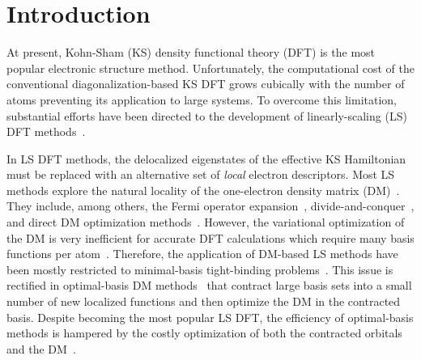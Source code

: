 \documentclass[10pt,amsmath,twocolumn,aps,prl,superscriptaddress,floatfix]{revtex4-1}
\begin{document}
\section{Introduction}

At present, Kohn-Sham (KS) density functional theory (DFT) is the most popular electronic structure method. 
Unfortunately, the computational cost of the conventional diagonalization-based KS DFT grows cubically with the number of atoms preventing its application to large systems. 
To overcome this limitation, substantial efforts have been directed to the development of linearly-scaling (LS) DFT methods~\cite{goedecker1999linear,bowler2012methods,zalesny2011linear}. 

In LS DFT methods, the delocalized eigenstates of the effective KS Hamiltonian must be replaced with an alternative set of \emph{local} electron descriptors. 
Most LS methods explore the natural locality of the one-electron density matrix (DM)~\cite{li1993density, lee1996linear, li2003density, shao2003curvy, vandevondele2012linear, kussmann2013linear, aarons2016perspective}.  
They include, among others, the Fermi operator expansion~\cite{goedecker1994efficient, goedecker1995tight}, divide-and-conquer~\cite{yang1991direct, yang1991local}, and direct DM optimization methods~\cite{li1993density, shao2003curvy, vandevondele2012linear}. 
However, the variational optimization of the DM is very inefficient for accurate DFT calculations which require many basis functions per atom~\cite{goedecker1999linear,vandevondele2012linear, arita2014stable, bowler2012methods, khaliullin2013efficient}.
Therefore, the application of DM-based LS methods have been mostly restricted to minimal-basis tight-binding problems~\cite{richters2014self, goringe1997tight, ratcliff2018band}. 
This issue is rectified in optimal-basis DM methods~\cite{skylaris2005introducing, nakata2015optimized, mohr2015accurate} that contract large basis sets into a small number of new localized functions and then optimize the DM in the contracted basis. 
Despite becoming the most popular LS DFT, the efficiency of optimal-basis methods is hampered by the costly optimization of both the contracted orbitals and the DM~\cite{mostofi2003preconditioned}.
\end{document}

